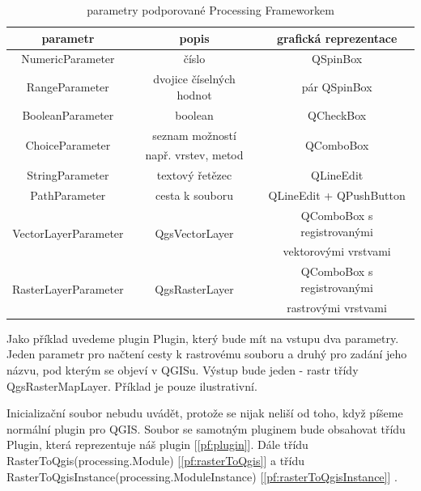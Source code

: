 \begin{table}	
	\centering
	\begin{tabular}{|c|c|c|}
		\hline
		\textbf{parametr} & \textbf{popis} & \textbf{grafická reprezentace}\\
		\hline
		\hline
		NumericParameter & číslo & QSpinBox\\
		\hline
		RangeParameter & dvojice číselných hodnot & pár QSpinBox\\	
		\hline
		BooleanParameter & boolean & QCheckBox\\		
		\hline
		\multirow{2}{*}{ChoiceParameter} & seznam možností & \multirow{2}{*}{QComboBox}\\
		& např. vrstev, metod & \\
		\hline
		StringParameter & textový řetězec & QLineEdit \\
		\hline
		PathParameter & cesta k souboru & QLineEdit + QPushButton \\
		\hline
		\multirow{2}{*}{VectorLayerParameter} & \multirow{2}{*}{QgsVectorLayer} & QComboBox s registrovanými \\
		& & vektorovými vrstvami\\
		\hline
		\multirow{2}{*}{RasterLayerParameter} & \multirow{2}{*}{QgsRasterLayer} & QComboBox s registrovanými \\
		& & rastrovými vrstvami\\		
		\hline	
	\end{tabular}
	\caption{parametry podporované Processing Frameworkem}
	\label{tab:pf_parametry}
\end{table}

Jako příklad uvedeme plugin Plugin, který bude mít na vstupu dva
parametry. Jeden parametr pro načtení cesty k rastrovému souboru a
druhý pro zadání jeho názvu, pod kterým se objeví v QGISu. Výstup bude
jeden - rastr třídy QgsRasterMapLayer. Příklad je pouze ilustrativní.

Inicializační soubor nebudu uvádět, protože se nijak neliší od toho,
když píšeme normální plugin pro QGIS. Soubor se samotným pluginem bude
obsahovat třídu Plugin, která reprezentuje náš plugin
[\autoref{pf:plugin}]. Dále třídu RasterToQgis(processing.Module)
[\autoref{pf:rasterToQgis}] a třídu
RasterToQgisInstance(processing.ModuleInstance)
[\autoref{pf:rasterToQgisInstance}] .\\

